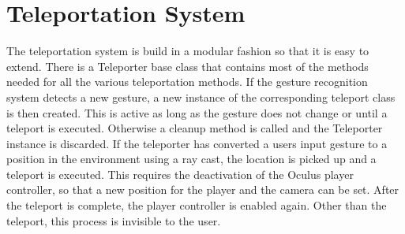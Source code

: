 \section{Teleportation System}
The teleportation system is build in a modular fashion so that it is easy to extend. There is a Teleporter base class that contains most of the methods needed for all the various teleportation methods. If the gesture recognition system detects a new gesture, a new instance of the corresponding teleport class is then created. This is active as long as the gesture does not change or until a teleport is executed. Otherwise a cleanup method is called and the Teleporter instance is discarded. If the teleporter has converted a users input gesture to a position in the environment using a ray cast, the location is picked up and a teleport is executed. This requires the deactivation of the Oculus player controller, so that a new position for the player and the camera can be set. After the teleport is complete, the player controller is enabled again. Other than the teleport, this process is invisible to the user. 
